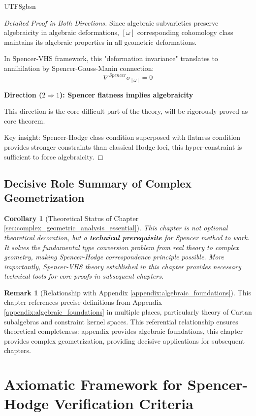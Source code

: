 \documentclass[a4paper,12pt]{extarticle}
\newtheorem{corollary}[theorem]{Corollary}
\theoremstyle{definition}
\newtheorem{remark}{Remark}[section]
\begin{document}
\begin{CJK}{UTF8}{gbsn}
\begin{proof}[Detailed Proof in Both Directions]
Since algebraic subvarieties preserve algebraicity in algebraic deformations, $[\omega]$ corresponding cohomology class maintains its algebraic properties in all geometric deformations.

In Spencer-VHS framework, this "deformation invariance" translates to annihilation by Spencer-Gauss-Manin connection:
$$\nabla^{Spencer} \sigma_{[\omega]} = 0$$

\textbf{Direction ($2 \Rightarrow 1$): Spencer flatness implies algebraicity}

This direction is the core difficult part of the theory, will be rigorously proved as core theorem.

Key insight: Spencer-Hodge class condition superposed with flatness condition provides stronger constraints than classical Hodge loci, this hyper-constraint is sufficient to force algebraicity.
\end{proof}

\subsection{Decisive Role Summary of Complex Geometrization}
\label{subsec:complexification_decisive_role}

\begin{corollary}[Theoretical Status of Chapter \ref{sec:complex_geometric_analysis_essential}]
\label{cor:chapter_theoretical_status}
This chapter is not optional theoretical decoration, but a \textbf{technical prerequisite} for Spencer method to work. It solves the fundamental type conversion problem from real theory to complex geometry, making Spencer-Hodge correspondence principle possible. More importantly, Spencer-VHS theory established in this chapter provides necessary technical tools for core proofs in subsequent chapters.
\end{corollary}

\begin{remark}[Relationship with Appendix \ref{appendix:algebraic_foundations}]
This chapter references precise definitions from Appendix \ref{appendix:algebraic_foundations} in multiple places, particularly theory of Cartan subalgebras and constraint kernel spaces. This referential relationship ensures theoretical completeness: appendix provides algebraic foundations, this chapter provides complex geometrization, providing decisive applications for subsequent chapters.
\end{remark}

\section{Axiomatic Framework for Spencer-Hodge Verification Criteria}
\label{sec:axiomatic_framework}


\end{CJK}
\end{document}
